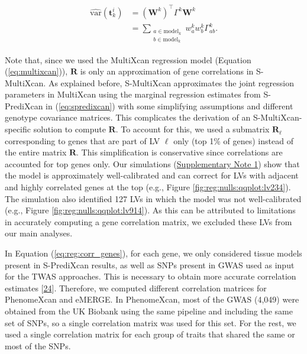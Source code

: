 \documentclass[
  legalpaperpaper,
]{article}
\begin{document}
\begin{equation}
\begin{split}
\widehat{\mathrm{var}}(\mathbf{t}_k^i) & = (\mathbf{W}^k)^\top \Gamma^k \mathbf{W}^k \\
        & = \sum_{\substack{a \in \mathrm{model}_k \\ b \in \mathrm{model}_k}} w_a^k w_b^k \Gamma_{ab}^k.
\end{split}
\label{eq:reg:var_gene}\end{equation}

Note that, since we used the MultiXcan regression model (Equation (\ref{eq:multixcan})), \(\mathbf{R}\) is only an approximation of gene correlations in S-MultiXcan.
As explained before, S-MultiXcan approximates the joint regression parameters in MultiXcan using the marginal regression estimates from S-PrediXcan in (\ref{eq:spredixcan}) with some simplifying assumptions and different genotype covariance matrices.
This complicates the derivation of an S-MultiXcan-specific solution to compute \(\mathbf{R}\).
To account for this, we used a submatrix \(\mathbf{R}_{\ell}\) corresponding to genes that are part of LV \(\ell\) only (top 1\% of genes) instead of the entire matrix \(\mathbf{R}\).
This simplification is conservative since correlations are accounted for top genes only.
Our simulations (\protect\hyperlink{sm:reg:null_sim}{Supplementary Note 1}) show that the model is approximately well-calibrated and can correct for LVs with adjacent and highly correlated genes at the top (e.g., Figure \ref{fig:reg:nulls:qqplot:lv234}).
The simulation also identified 127 LVs in which the model was not well-calibrated (e.g., Figure \ref{fig:reg:nulls:qqplot:lv914}).
As this can be attributed to limitations in accurately computing a gene correlation matrix, we excluded these LVs from our main analyses.

In Equation (\ref{eq:reg:corr_genes}), for each gene, we only considered tissue models present in S-PrediXcan results, as well as SNPs present in GWAS used as input for the TWAS approaches.
This is necessary to obtain more accurate correlation estimates {[}\protect\hyperlink{ref-1FFzCXo1s}{24}{]}.
Therefore, we computed different correlation matrices for PhenomeXcan and eMERGE.
In PhenomeXcan, most of the GWAS (4,049) were obtained from the UK Biobank using the same pipeline and including the same set of SNPs, so a single correlation matrix was used for this set.
For the rest, we used a single correlation matrix for each group of traits that shared the same or most of the SNPs.
\end{document}
